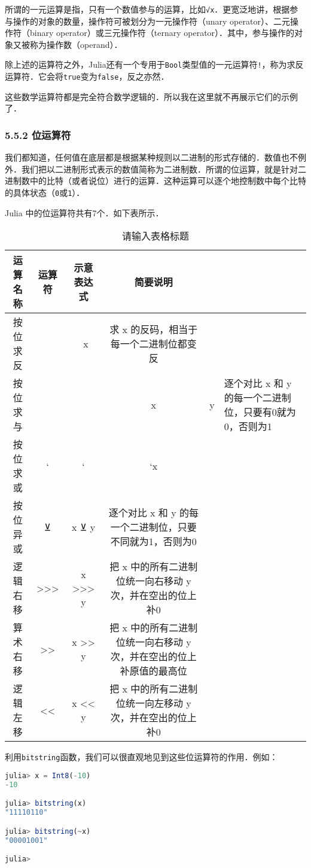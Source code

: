 所谓的一元运算是指，只有一个数值参与的运算，比如\verb|√x|．更宽泛地讲，根据参与操作的对象的数量，操作符可被划分为一元操作符（unary operator）、二元操作符（binary operator）或三元操作符（ternary operator）．其中，参与操作的对象又被称为操作数（operand）．

除上述的运算符之外，Julia还有一个专用于\verb|Bool|类型值的一元运算符\verb|!|，称为求反运算符．它会将\verb|true|变为\verb|false|，反之亦然．

这些数学运算符都是完全符合数学逻辑的．所以我在这里就不再展示它们的示例了．

\subsubsection{5.5.2 位运算符}

我们都知道，任何值在底层都是根据某种规则以二进制的形式存储的．数值也不例外．我们把以二进制形式表示的数值简称为二进制数．所谓的位运算，就是针对二进制数中的比特（或者说位）进行的运算．这种运算可以逐个地控制数中每个比特的具体状态（\verb|0|或\verb|1|）．

Julia 中的位运算符共有7个．如下表所示．
\begin{table}[ht]
\centering
\caption{请输入表格标题}\label{JuC5S5_tab4}
\begin{tabular}{|c|c|c|c|}
\hline
运算名称 & 运算符 & 示意表达式 & 简要说明 \\
\hline
按位求反 & ~ & ~x & 求 x 的反码，相当于每一个二进制位都变反 \\
\hline
按位求与 & & & x & y & 逐个对比 x 和 y 的每一个二进制位，只要有0就为0，否则为1 \\
\hline
按位求或&`&`&`x \\
\hline
按位异或&⊻&x ⊻ y&逐个对比 x 和 y 的每一个二进制位，只要不同就为1，否则为0 \\
\hline
逻辑右移&>>>&x >>> y&把 x 中的所有二进制位统一向右移动 y 次，并在空出的位上补0 \\
\hline
算术右移&>>&x >> y&把 x 中的所有二进制位统一向右移动 y 次，并在空出的位上补原值的最高位 \\
\hline
逻辑左移&<<&x << y&把 x 中的所有二进制位统一向左移动 y 次，并在空出的位上补0
\hline
\end{tabular}
\end{table}

利用\verb|bitstring|函数，我们可以很直观地见到这些位运算符的作用．例如：
\begin{lstlisting}[language=julia]
julia> x = Int8(-10)
-10

julia> bitstring(x)
"11110110"

julia> bitstring(~x)
"00001001"

julia> 
\end{lstlisting}


